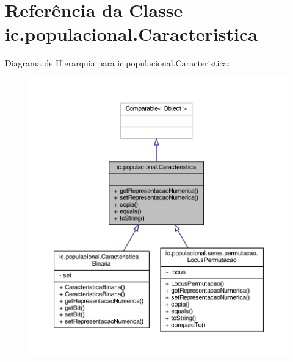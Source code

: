 \hypertarget{classic_1_1populacional_1_1_caracteristica}{\section{Referência da Classe ic.\-populacional.\-Caracteristica}
\label{classic_1_1populacional_1_1_caracteristica}
}


Diagrama de Hierarquia para ic.\-populacional.\-Caracteristica\-:\nopagebreak
\begin{figure}[H]
\begin{center}
\leavevmode
\includegraphics[width=350pt]{classic_1_1populacional_1_1_caracteristica__inherit__graph}
\end{center}
\end{figure}


